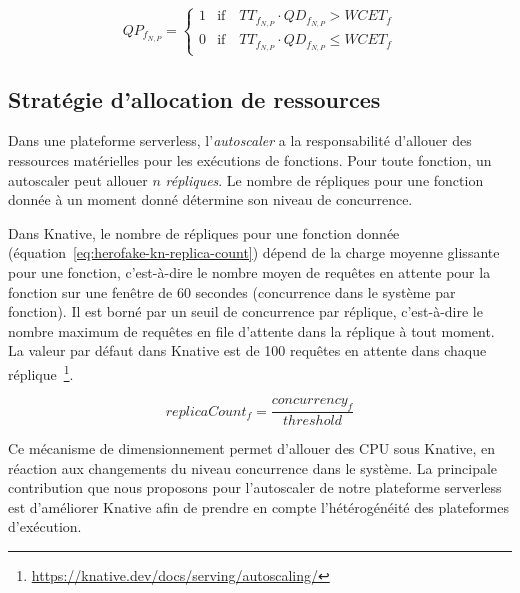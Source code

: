 
\begin{equation}
    QP_{f_{N, P}} =
    \begin{cases}
    1 & \text{if} \quad TT_{f_{N, P}} \cdot QD_{f_{N, P}} > WCET_{f} \\
    0 & \text{if} \quad TT_{f_{N, P}} \cdot QD_{f_{N, P}} \leq WCET_{f}
    \end{cases}
\label{eq:herofake-task-penalty}
\end{equation}

\subsection{Stratégie d'allocation de ressources} \label{section:herofake-autoscaling-strategy}

Dans une plateforme serverless, l'\textit{autoscaler} a la responsabilité d'allouer des ressources matérielles pour les exécutions de fonctions. Pour toute fonction, un autoscaler peut allouer $n$ \textit{répliques}. Le nombre de répliques pour une fonction donnée à un moment donné détermine son niveau de concurrence.

Dans Knative, le nombre de répliques pour une fonction donnée (équation~\ref{eq:herofake-kn-replica-count}) dépend de la charge moyenne glissante pour une fonction, c'est-à-dire le nombre moyen de requêtes en attente pour la fonction sur une fenêtre de 60 secondes (concurrence dans le système par fonction). Il est borné par un seuil de concurrence par réplique, c'est-à-dire le nombre maximum de requêtes en file d'attente dans la réplique à tout moment. La valeur par défaut dans Knative est de 100 requêtes en attente dans chaque réplique~\footnote{\href{https://knative.dev/docs/serving/autoscaling/}{https://knative.dev/docs/serving/autoscaling/}}.

\begin{equation}
    replicaCount_{f} = \frac{concurrency_{f}}{threshold}
\label{eq:herofake-kn-replica-count}
\end{equation}

Ce mécanisme de dimensionnement permet d'allouer des CPU sous Knative, en réaction aux changements du niveau concurrence dans le système. La principale contribution que nous proposons pour l'autoscaler de notre plateforme serverless est d'améliorer Knative afin de prendre en compte l'hétérogénéité des plateformes d'exécution.

